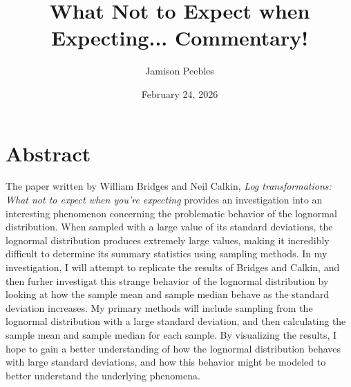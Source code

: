 \documentclass{article}
\title{What Not to Expect when Expecting... Commentary!}
\author{Jamison Peebles}
\date{February 24, 2026}
\begin{document}
\maketitle

\section{Abstract}

The paper written by William Bridges and Neil Calkin, \textit{Log transformations: What not to expect when you're expecting} provides an investigation into an interesting phenomenon concerning the problematic behavior of the lognormal distribution. 
When sampled with a large value of its standard deviations, the lognormal distribution produces extremely large values, making it incredibly difficult to determine its summary statistics using sampling methods.
In my investigation, I will attempt to replicate the results of Bridges and Calkin, and then furher investigat this strange behavior of the lognormal distribution by looking at how the sample mean and sample median behave as the standard deviation increases.
My primary methods will include sampling from the lognormal distribution with a large standard deviation, and then calculating the sample mean and sample median for each sample.
By visualizing the results, I hope to gain a better understanding of how the lognormal distribution behaves with large standard deviations, and how this behavior might be modeled to better understand the underlying phenomena.
\end{document}
